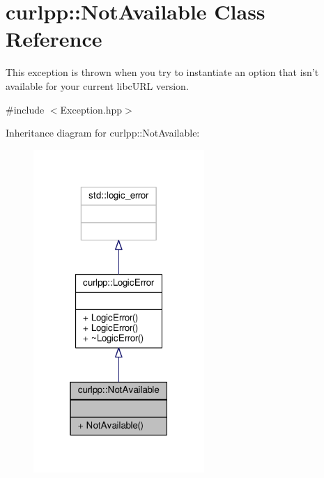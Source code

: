 \hypertarget{classcurlpp_1_1NotAvailable}{\section{curlpp\-:\-:Not\-Available Class Reference}
\label{classcurlpp_1_1NotAvailable}
}


This exception is thrown when you try to instantiate an option that isn't available for your current libc\-U\-R\-L version.  




{\ttfamily \#include $<$Exception.\-hpp$>$}



Inheritance diagram for curlpp\-:\-:Not\-Available\-:
\nopagebreak
\begin{figure}[H]
\begin{center}
\leavevmode
\includegraphics[width=184pt]{classcurlpp_1_1NotAvailable__inherit__graph}
\end{center}
\end{figure}


